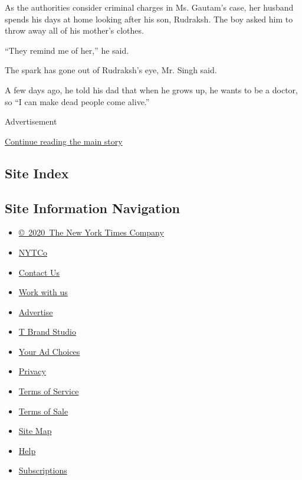 As the authorities consider criminal charges in Ms. Gautam's case, her
husband spends his days at home looking after his son, Rudraksh. The boy
asked him to throw away all of his mother's clothes.

``They remind me of her,'' he said.

The spark has gone out of Rudraksh's eye, Mr. Singh said.

A few days ago, he told his dad that when he grows up, he wants to be a
doctor, so ``I can make dead people come alive.''

Advertisement

\protect\hyperlink{after-bottom}{Continue reading the main story}

\hypertarget{site-index}{%
\subsection{Site Index}\label{site-index}}

\hypertarget{site-information-navigation}{%
\subsection{Site Information
Navigation}\label{site-information-navigation}}

\begin{itemize}
\tightlist
\item
  \href{https://help.nytimes.com/hc/en-us/articles/115014792127-Copyright-notice}{©~2020~The
  New York Times Company}
\end{itemize}

\begin{itemize}
\tightlist
\item
  \href{https://www.nytco.com/}{NYTCo}
\item
  \href{https://help.nytimes.com/hc/en-us/articles/115015385887-Contact-Us}{Contact
  Us}
\item
  \href{https://www.nytco.com/careers/}{Work with us}
\item
  \href{https://nytmediakit.com/}{Advertise}
\item
  \href{http://www.tbrandstudio.com/}{T Brand Studio}
\item
  \href{https://www.nytimes.com/privacy/cookie-policy\#how-do-i-manage-trackers}{Your
  Ad Choices}
\item
  \href{https://www.nytimes.com/privacy}{Privacy}
\item
  \href{https://help.nytimes.com/hc/en-us/articles/115014893428-Terms-of-service}{Terms
  of Service}
\item
  \href{https://help.nytimes.com/hc/en-us/articles/115014893968-Terms-of-sale}{Terms
  of Sale}
\item
  \href{https://spiderbites.nytimes.com}{Site Map}
\item
  \href{https://help.nytimes.com/hc/en-us}{Help}
\item
  \href{https://www.nytimes.com/subscription?campaignId=37WXW}{Subscriptions}
\end{itemize}

